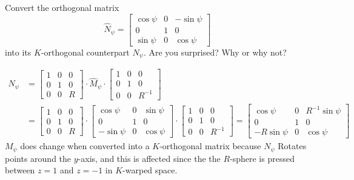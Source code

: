 \documentclass[newpage,hints,handout,noauthor,nooutcomes,12pt]{ximera}
\begin{document}
\begin{problem}
  Convert the orthogonal matrix
  \[
  \hat{N}_\psi=\begin{bmatrix}
  \cos\psi & 0 & -\sin\psi\\
  0 & 1 & 0\\
  \sin\psi & 0 & \cos\psi
  \end{bmatrix}
  \]
  into its $K$-orthogonal counterpart $N_\psi$. Are you surprised? Why or why not?
  
\begin{freeResponse}
\begin{align*}
N_\psi &= \begin{bmatrix}
1 & 0 & 0\\
0 & 1 & 0\\
0 & 0 & R%
\end{bmatrix} \cdot \hat{M}_\psi \cdot
\begin{bmatrix}
1 & 0 & 0\\
0 & 1 & 0\\
0 & 0 & R^{-1}%
\end{bmatrix} \\
&= \begin{bmatrix}
1 & 0 & 0\\
0 & 1 & 0\\
0 & 0 & R%
\end{bmatrix} \cdot 
\begin{bmatrix}
  \cos\psi & 0 & \sin\psi\\
  0 & 1 & 0\\
  -\sin\psi & 0 & \cos\psi
  \end{bmatrix} \cdot
\begin{bmatrix}
1 & 0 & 0\\
0 & 1 & 0\\
0 & 0 & R^{-1}%
\end{bmatrix}
=\begin{bmatrix}
  \cos\psi & 0 & R^{-1} \sin\psi\\
  0 & 1 & 0\\
  -R\sin\psi & 0 & \cos\psi
  \end{bmatrix} 
\end{align*} 
$M_\psi$ does change when converted into a $K$-orthogonal matrix because $N_\psi$ Rotates points around the $y$-axis, and this is affected since the  the $R$-sphere is pressed between $z=1$ and $z=-1$ in $K$-warped space. 
\end{freeResponse}

\end{problem}
\end{document}
